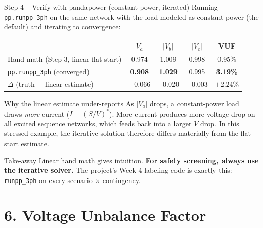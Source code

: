 \documentclass[aspectratio=169,10pt]{beamer}
\newcommand{\code}[1]{\texttt{#1}}
\begin{document}
\begin{frame}[shrink=8]{Step 4 -- Verify with pandapower (constant-power, iterated)}
Running \code{pp.runpp\_3ph} on the same network with the load modeled as constant-power (the default) and iterating to convergence:
\vspace{0.4em}
\centering
\small
\begin{tabular}{lcccc}
\toprule
 & $|V_a|$ & $|V_b|$ & $|V_c|$ & VUF \\
\midrule
Hand math (Step 3, linear flat-start) & 0.974 & 1.009 & 0.998 & 0.95\% \\
\code{pp.runpp\_3ph} (converged) & \textbf{0.908} & \textbf{1.029} & 0.995 & \textbf{3.19\%} \\
$\Delta$ (truth $-$ linear estimate) & $-0.066$ & $+0.020$ & $-0.003$ & $+2.24\%$ \\
\bottomrule
\end{tabular}
\vspace{0.6em}
\begin{block}{Why the linear estimate under-reports}
As $|V_a|$ drops, a constant-power load draws \emph{more} current ($I = (S/V)^*$). More current produces more voltage drop on all excited sequence networks, which feeds back into a larger $V$ drop. In this stressed example, the iterative solution therefore differs materially from the flat-start estimate.
\end{block}
\begin{alertblock}{Take-away}
Linear hand math gives intuition. \textbf{For safety screening, always use the iterative solver.} The project's Week 4 labeling code is exactly this: \code{runpp\_3ph} on every scenario $\times$ contingency.
\end{alertblock}
\end{frame}

\section*{6. Voltage Unbalance Factor}
\end{document}
